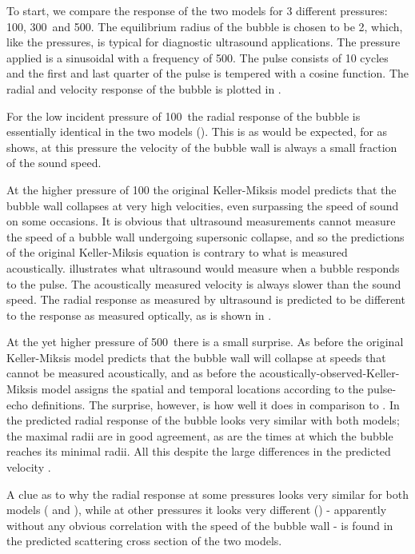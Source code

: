 To start, we compare  the response of the two models for 3 different pressures:
\unit{100}\kilo\pascal, \unit{300}\kilo\pascal\ and \unit{500}\kilo\pascal.
The equilibrium radius of the bubble is chosen to be \unit{2}\micro\meter, 
which, like the pressures, is typical for diagnostic ultrasound applications.
The pressure applied is a sinusoidal  with a frequency of \unit{500}\kilo\hertz.
The pulse consists of 10 cycles and the first and last quarter of the pulse is tempered with a cosine function.
The radial and velocity response of the bubble is plotted in .




For the low incident pressure of \unit{100}\kilo\pascal\ the radial response of the bubble is essentially identical in the two models ().
This is as would be expected, for as  shows,  at this pressure the velocity of the bubble wall 
is always a small fraction of the sound speed.

At the higher pressure of \unit{100}\kilo\pascal 
the original Keller-Miksis model predicts that the bubble wall collapses at very high velocities,
even surpassing the speed of sound on some occasions.
It is obvious that ultrasound measurements cannot measure the speed of a bubble wall undergoing  supersonic collapse, 
and so the predictions of the original Keller-Miksis equation is contrary to what is measured acoustically.
 illustrates what ultrasound would measure when a bubble responds to the pulse.
The acoustically measured velocity is always slower than the sound speed.
The radial response as measured by ultrasound is predicted to be different to the response as measured optically, 
as is shown in .

At the yet higher pressure of \unit{500}\kilo\pascal\ there is a small surprise.
As before the original Keller-Miksis model predicts that the bubble wall will collapse at speeds that cannot be measured acoustically,
and as before the acoustically-observed-Keller-Miksis model assigns the  spatial and temporal locations according to the pulse-echo definitions.
The surprise, 
however, is how well it does in comparison to .
In  the predicted radial response of the bubble looks very similar with both models;
the maximal radii are in good agreement, as are the  times at which the bubble reaches its minimal radii.
All this despite the large differences in the predicted velocity .

A clue as to why the radial response at some pressures looks very similar for both models ( and ),
while at other pressures it looks very different () 
- apparently without any obvious correlation with the speed of the bubble wall -
is found in the predicted scattering cross section of the two models.

